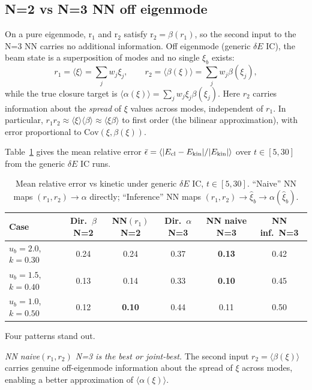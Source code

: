 \documentclass[11pt]{article}
\newcommand{\xib}{\xi_b}
\newcommand{\ub}{u_b}
\begin{document}
\subsection{N=2 vs N=3 NN off eigenmode}
\label{subsec:offmode}

On a pure eigenmode, r$_1$ and r$_2$ satisfy r$_2 = \beta(r_1)$, so the
second input to the N=3 NN carries no additional information.  Off eigenmode
(generic $\delta E$ IC), the beam state is a superposition of modes and no
single $\xib$ exists:
\begin{equation}
  r_1 = \langle\xi\rangle = \sum_j w_j \xi_j, \qquad
  r_2 = \langle\beta(\xi)\rangle = \sum_j w_j \beta(\xi_j),
\end{equation}
while the true closure target is $\langle\alpha(\xi)\rangle = \sum_j w_j
\xi_j\beta(\xi_j)$.  Here $r_2$ carries information about the
\emph{spread} of $\xi$ values across modes, independent of $r_1$.  In
particular, $r_1 r_2 \approx \langle\xi\rangle\langle\beta\rangle \approx
\langle\xi\beta\rangle$ to first order (the bilinear approximation), with
error proportional to $\text{Cov}(\xi, \beta(\xi))$.

Table~\ref{tab:offmfld} gives the mean relative error $\bar\epsilon =
\langle|E_{\rm cl} - E_{\rm kin}|/|E_{\rm kin}|\rangle$ over $t \in [5,30]$
from the generic $\delta E$ IC runs.

\begin{table}[H]
\centering
\caption{Mean relative error vs kinetic under generic $\delta E$ IC,
  $t \in [5, 30]$.  ``Naive'' NN maps $(r_1,r_2)\to\alpha$ directly;
  ``Inference'' NN maps $(r_1,r_2)\to\hat\xi_b\to\alpha(\hat\xi_b)$.}
\label{tab:offmfld}
\begin{tabular}{lccccc}
\toprule
Case & Dir.\ $\beta$ N=2 & NN$(r_1)$ N=2 & Dir.\ $\alpha$ N=3 &
  NN naive N=3 & NN inf.\ N=3 \\
\midrule
$\ub=2.0$, $k=0.30$ & 0.24 & 0.24 & 0.37 & \textbf{0.13} & 0.42 \\
$\ub=1.5$, $k=0.40$ & 0.13 & 0.14 & 0.33 & \textbf{0.10} & 0.45 \\
$\ub=1.0$, $k=0.50$ & 0.12 & \textbf{0.10} & 0.44 & 0.11 & 0.50 \\
\bottomrule
\end{tabular}
\end{table}

Four patterns stand out.

\emph{NN naive$(r_1,r_2)$ N=3 is the best or joint-best.}  The second
input $r_2 = \langle\beta(\xi)\rangle$ carries genuine off-eigenmode
information about the spread of $\xi$ across modes, enabling a better
approximation of $\langle\alpha(\xi)\rangle$.
\end{document}

